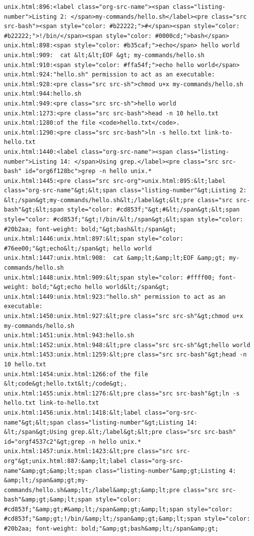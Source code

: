 \documentclass[11pt]{article}
\begin{document}
\begin{verbatim}
unix.html:896:<label class="org-src-name"><span class="listing-number">Listing 2: </span>my-commands/hello.sh</label><pre class="src src-bash"><span style="color: #b22222;">#</span><span style="color: #b22222;">!/bin/</span><span style="color: #0000cd;">bash</span>
unix.html:898:<span style="color: #b35caf;">echo</span> hello world
unix.html:909:  cat &lt;&lt;EOF &gt; my-commands/hello.sh
unix.html:910:<span style="color: #ffa54f;">echo hello world</span>
unix.html:924:"hello.sh" permission to act as an executable:
unix.html:928:<pre class="src src-sh">chmod u+x my-commands/hello.sh
unix.html:944:hello.sh
unix.html:949:<pre class="src src-sh">hello world
unix.html:1273:<pre class="src src-bash">head -n 10 hello.txt
unix.html:1280:of the file <code>hello.txt</code>.
unix.html:1290:<pre class="src src-bash">ln -s hello.txt link-to-hello.txt
unix.html:1440:<label class="org-src-name"><span class="listing-number">Listing 14: </span>Using grep.</label><pre class="src src-bash" id="org6f128bc">grep -n hello unix.*
unix.html:1445:<pre class="src src-org">unix.html:895:&lt;label class="org-src-name"&gt;&lt;span class="listing-number"&gt;Listing 2: &lt;/span&gt;my-commands/hello.sh&lt;/label&gt;&lt;pre class="src src-bash"&gt;&lt;span style="color: #cd853f;"&gt;#&lt;/span&gt;&lt;span style="color: #cd853f;"&gt;!/bin/&lt;/span&gt;&lt;span style="color: #20b2aa; font-weight: bold;"&gt;bash&lt;/span&gt;
unix.html:1446:unix.html:897:&lt;span style="color: #76ee00;"&gt;echo&lt;/span&gt; hello world
unix.html:1447:unix.html:908:  cat &amp;lt;&amp;lt;EOF &amp;gt; my-commands/hello.sh
unix.html:1448:unix.html:909:&lt;span style="color: #ffff00; font-weight: bold;"&gt;echo hello world&lt;/span&gt;
unix.html:1449:unix.html:923:"hello.sh" permission to act as an executable:
unix.html:1450:unix.html:927:&lt;pre class="src src-sh"&gt;chmod u+x my-commands/hello.sh
unix.html:1451:unix.html:943:hello.sh
unix.html:1452:unix.html:948:&lt;pre class="src src-sh"&gt;hello world
unix.html:1453:unix.html:1259:&lt;pre class="src src-bash"&gt;head -n 10 hello.txt
unix.html:1454:unix.html:1266:of the file &lt;code&gt;hello.txt&lt;/code&gt;.
unix.html:1455:unix.html:1276:&lt;pre class="src src-bash"&gt;ln -s hello.txt link-to-hello.txt
unix.html:1456:unix.html:1418:&lt;label class="org-src-name"&gt;&lt;span class="listing-number"&gt;Listing 14: &lt;/span&gt;Using grep.&lt;/label&gt;&lt;pre class="src src-bash" id="orgf4537c2"&gt;grep -n hello unix.*
unix.html:1457:unix.html:1423:&lt;pre class="src src-org"&gt;unix.html:887:&amp;lt;label class="org-src-name"&amp;gt;&amp;lt;span class="listing-number"&amp;gt;Listing 4: &amp;lt;/span&amp;gt;my-commands/hello.sh&amp;lt;/label&amp;gt;&amp;lt;pre class="src src-bash"&amp;gt;&amp;lt;span style="color: #cd853f;"&amp;gt;#&amp;lt;/span&amp;gt;&amp;lt;span style="color: #cd853f;"&amp;gt;!/bin/&amp;lt;/span&amp;gt;&amp;lt;span style="color: #20b2aa; font-weight: bold;"&amp;gt;bash&amp;lt;/span&amp;gt;

\end{verbatim}
\end{document}
